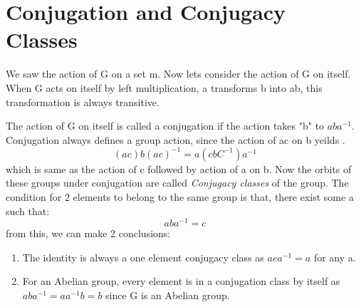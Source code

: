 \section{Conjugation and Conjugacy Classes}
We saw the action of G on a set m. Now lets consider the action of G on itself. When G acts on itself by left multiplication, a  transforms b into ab, this transformation is always transitive.


The action of G on itself is called a conjugation if the action takes "b" to $aba^{-1}$. Conjugation always defines a group action, since the action of ac on b yeilds . 
\begin{equation}
    (ac)b(ac)^{-1}=a(cbC^{-1})a^{-1}
\end{equation}
which is same as the action of c followed by action of a on b.
 Now the orbits of these groups under conjugation are called \textit{Conjugacy classes} of the group. The condition for 2 elements to belong to the same group is that, there exist some a such that:
 \begin{equation}
     aba^{-1}=c
 \end{equation}
from this, we can make 2 conclusions:
\begin{enumerate}
    \item The identity is always a one element conjugacy class as $aea^{-1}=a$ for any a.
    \item For an Abelian group, every element is in a conjugation class by itself as $aba^{-1}=aa^{-1}b=b$ since G is an Abelian group.
\end{enumerate}
